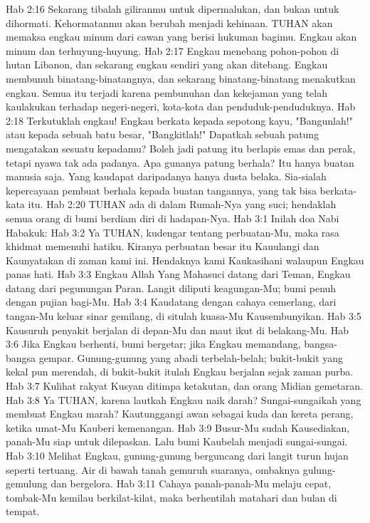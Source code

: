 Hab 2:16  Sekarang tibalah giliranmu untuk dipermalukan, dan bukan untuk dihormati. Kehormatanmu akan berubah menjadi kehinaan. TUHAN akan memaksa engkau minum dari cawan yang berisi hukuman bagimu. Engkau akan minum dan terhuyung-huyung.
Hab 2:17  Engkau menebang pohon-pohon di hutan Libanon, dan sekarang engkau sendiri yang akan ditebang. Engkau membunuh binatang-binatangnya, dan sekarang binatang-binatang menakutkan engkau. Semua itu terjadi karena pembunuhan dan kekejaman yang telah kaulakukan terhadap negeri-negeri, kota-kota dan penduduk-penduduknya.
Hab 2:18  Terkutuklah engkau! Engkau berkata kepada sepotong kayu, "Bangunlah!" atau kepada sebuah batu besar, "Bangkitlah!" Dapatkah sebuah patung mengatakan sesuatu kepadamu? Boleh jadi patung itu berlapis emas dan perak, tetapi nyawa tak ada padanya. Apa gunanya patung berhala? Itu hanya buatan manusia saja. Yang kaudapat daripadanya hanya dusta belaka. Sia-sialah kepercayaan pembuat berhala kepada buatan tangannya, yang tak bisa berkata-kata itu.
Hab 2:20  TUHAN ada di dalam Rumah-Nya yang suci; hendaklah semua orang di bumi berdiam diri di hadapan-Nya.
Hab 3:1  Inilah doa Nabi Habakuk:
Hab 3:2  Ya TUHAN, kudengar tentang perbuatan-Mu, maka rasa khidmat memenuhi hatiku. Kiranya perbuatan besar itu Kauulangi dan Kaunyatakan di zaman kami ini. Hendaknya kami Kaukasihani walaupun Engkau panas hati.
Hab 3:3  Engkau Allah Yang Mahasuci datang dari Teman, Engkau datang dari pegunungan Paran. Langit diliputi keagungan-Mu; bumi penuh dengan pujian bagi-Mu.
Hab 3:4  Kaudatang dengan cahaya cemerlang, dari tangan-Mu keluar sinar gemilang, di situlah kuasa-Mu Kausembunyikan.
Hab 3:5  Kausuruh penyakit berjalan di depan-Mu dan maut ikut di belakang-Mu.
Hab 3:6  Jika Engkau berhenti, bumi bergetar; jika Engkau memandang, bangsa-bangsa gempar. Gunung-gunung yang abadi terbelah-belah; bukit-bukit yang kekal pun merendah, di bukit-bukit itulah Engkau berjalan sejak zaman purba.
Hab 3:7  Kulihat rakyat Kusyan ditimpa ketakutan, dan orang Midian gemetaran.
Hab 3:8  Ya TUHAN, karena lautkah Engkau naik darah? Sungai-sungaikah yang membuat Engkau marah? Kautunggangi awan sebagai kuda dan kereta perang, ketika umat-Mu Kauberi kemenangan.
Hab 3:9  Busur-Mu sudah Kausediakan, panah-Mu siap untuk dilepaskan. Lalu bumi Kaubelah menjadi sungai-sungai.
Hab 3:10  Melihat Engkau, gunung-gunung berguncang dari langit turun hujan seperti tertuang. Air di bawah tanah gemuruh suaranya, ombaknya gulung-gemulung dan bergelora.
Hab 3:11  Cahaya panah-panah-Mu melaju cepat, tombak-Mu kemilau berkilat-kilat, maka berhentilah matahari dan bulan di tempat.
